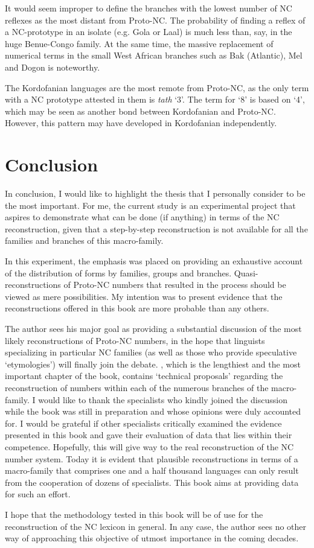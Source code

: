It would seem improper to define the branches with the lowest number of NC reflexes as the most distant from Proto-NC. The probability of finding a reflex of a NC-prototype in an isolate (e.g. Gola or Laal) is much less than, say, in the huge Benue-Congo family. At the same time, the massive replacement of numerical terms in the small West African branches such as Bak (Atlantic), Mel and Dogon is noteworthy.

The Kordofanian languages are the most remote from Proto-NC, as the only term with a NC prototype attested in them is \textit{tath} ‘3’. The term for ‘8’ is based on ‘4’, which may be seen as another bond between Kordofanian and Proto-NC. However, this pattern may have developed in Kordofanian independently. 


\section{Conclusion}
In conclusion, I would like to highlight the thesis that I personally consider to be the most important. For me, the current study is an experimental project that aspires to demonstrate what can be done (if anything) in terms of the NC reconstruction, given that a step-by-step reconstruction is not available for all the families and branches of this macro-family.

In this experiment, the emphasis was placed on providing an exhaustive account of the distribution of forms by families, groups and branches. Quasi-recon\-structions of Proto-NC numbers that resulted in the process should be viewed as mere possibilities. My intention was to present evidence that the reconstructions offered in this book are more probable than any others. 

\newpage 
The author sees his major goal as providing a substantial discussion of the most likely reconstructions of Proto-NC numbers, in the hope that linguists specializing in particular NC families (as well as those who provide speculative ‘etymologies’) will finally join the debate. , which is the lengthiest and the most important chapter of the book, contains ‘technical proposals’ regarding the reconstruction of numbers within each of the numerous branches of the macro-family. I would like to thank the specialists who kindly joined the discussion while the book was still in preparation and whose opinions were duly accounted for. I would be grateful if other specialists critically examined the evidence presented in this book and gave their evaluation of data that lies within their competence. Hopefully, this will give way to the real reconstruction of the NC number system. Today it is evident that plausible reconstructions in terms of a macro-family that comprises one and a half thousand languages can only result from the cooperation of dozens of specialists. This book aims at providing data for such an effort.  

I hope that the methodology tested in this book will be of use for the reconstruction of the NC lexicon in general. In any case, the author sees no other way of approaching this objective of utmost importance in the coming decades.

